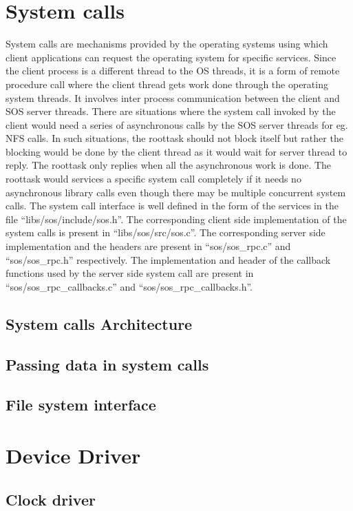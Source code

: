 \documentclass[a4paper, 11pt]{article}
\begin{document}
\section{System calls}
System calls are mechanisms provided by the operating systems using
which client applications can request the operating system for
specific services. Since the client process is a different thread to
the OS threads, it is a form of remote procedure call where the client
thread gets work done through the operating system threads. It
involves inter process communication between the client and SOS server
threads. There are situations where the system call invoked by the
client would need a series of asynchronous calls by the SOS server
threads for eg. NFS calls. In such situations, the roottask should not
block itself but rather the blocking would be done by the client
thread as it would wait for server thread to reply. The roottask only
replies when all the asynchronous work is done. The roottask would
services a specific system call completely if it needs no asynchronous
library calls even though there may be multiple concurrent system
calls. The system call interface is well defined in the form of the
services in the file ``libs/sos/include/sos.h''. The corresponding
client side implementation of the system calls is present in
``libs/sos/src/sos.c''. The corresponding server side implementation
and the headers are present in ``sos/sos\_rpc.c'' and ``sos/sos\_rpc.h''
respectively. The implementation and header of the callback functions used by the
server side system call are present in ``sos/sos\_rpc\_callbacks.c'' and
``sos/sos\_rpc\_callbacks.h''. 
\subsection{System calls Architecture}
\subsection{Passing data in system calls}
\subsection{File system interface}
\newpage
\section{Device Driver}
\subsection{Clock driver}
\newpage
\end{document}
